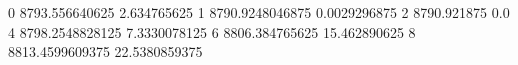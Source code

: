 0 8793.556640625 2.634765625
1 8790.9248046875 0.0029296875
2 8790.921875 0.0
4 8798.2548828125 7.3330078125
6 8806.384765625 15.462890625
8 8813.4599609375 22.5380859375
